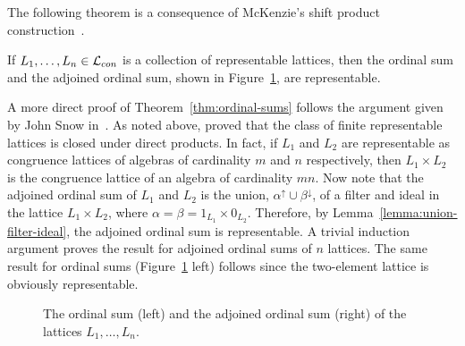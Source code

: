 The following theorem is a consequence of 
McKenzie's shift product construction~\cite{McKenzie:1984}. 
\begin{theorem}
  \label{thm:ordinal-sums}
  If $L_1, \dots, L_n \in \mathcal{L}_{con}$ is a collection of representable lattices, then
  the ordinal sum and the adjoined ordinal sum, shown in
  Figure~\ref{fig:ord_adjord}, are representable.
\end{theorem}
A more direct proof of Theorem~\ref{thm:ordinal-sums} follows the argument given
by John Snow in~\cite{Snow:2000}.  As noted above, 
\Jiri \Tuma proved that
the class of finite representable lattices is closed under direct products.
In fact, if $L_1$ and 
$L_2$ are representable as congruence lattices of algebras of cardinality $m$ and $n$ respectively, then $L_1 \times L_2$ is the congruence lattice of an algebra of
cardinality $mn$. Now note that the
adjoined ordinal sum of $L_1$ and $L_2$ is the union, $\alpha^\uparrow \cup
\beta^\downarrow$,  of a filter and ideal  
in the lattice $L_1 \times L_2$, where
$\alpha = \beta = 1_{L_1} \times 0_{L_2}$.  
Therefore, by Lemma~\ref{lemma:union-filter-ideal},
the adjoined ordinal sum is representable.  A trivial induction argument proves the
result for adjoined ordinal sums of $n$ lattices.  The same result for ordinal
sums (Figure~\ref{fig:ord_adjord} left) follows since the two-element lattice is
obviously representable. 

  \begin{figure}[h!]
    \label{fig:ord_adjord}
    \centering
        {
          \hskip1cm
        }
        \caption{The ordinal sum (left) and the adjoined ordinal sum (right) of
          the lattices $L_1, \dots, L_n$.}
  \end{figure}


